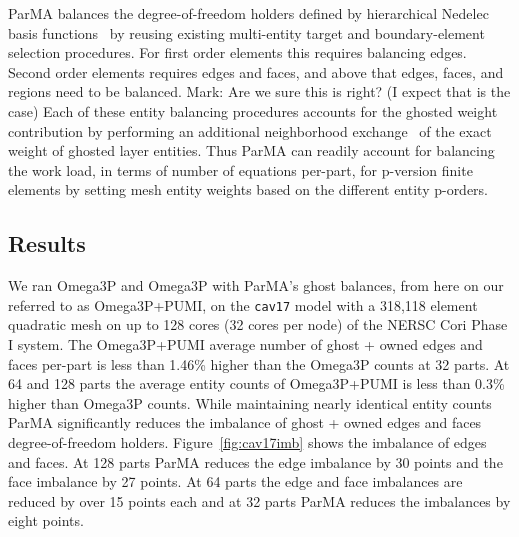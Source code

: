 \documentclass[review,12pt]{elsarticle_summary_report}
\begin{document}
ParMA balances the degree-of-freedom holders defined by 
hierarchical Nedelec basis functions~\cite{ingelstrom2006new,ko2010advances} by
reusing existing multi-entity target and boundary-element selection
procedures.
For first order elements this requires balancing edges.
Second order elements requires edges and faces, and above that edges, faces, and
regions need to be balanced. \color{blue} Mark: Are we sure this is right? (I expect that is the case) \color{black}
Each of these entity balancing procedures accounts for the ghosted weight
contribution by performing an additional neighborhood
exchange~\cite{ibanez2014hybrid} of the exact weight of ghosted layer entities.
Thus ParMA can readily account for balancing the work load, in terms of number
of equations per-part, for p-version finite elements by setting mesh entity
weights based on the different entity p-orders. 

\subsection{\label{load_balance_results} Results}

We ran Omega3P and Omega3P with ParMA's ghost balances, from here on our referred
to as Omega3P+PUMI, on the \texttt{cav17} model with a 318,118
element quadratic mesh on up to 128 cores (32 cores per node) of the NERSC Cori
Phase I system.
The Omega3P+PUMI average number of ghost + owned edges and faces per-part
is less than 1.46\% higher than the Omega3P counts at 32 parts.
At 64 and 128 parts the average entity counts of Omega3P+PUMI is less than 0.3\%
higher than Omega3P counts.
While maintaining nearly identical entity counts ParMA significantly reduces the
imbalance of ghost + owned edges and faces degree-of-freedom holders.
Figure~\ref{fig:cav17imb} shows the imbalance of edges and faces.
At 128 parts ParMA reduces the edge imbalance by 30 points and the face
imbalance by 27 points.
At 64 parts the edge and face imbalances are reduced by over 15 points each and
at 32 parts ParMA reduces the imbalances by eight points.
\end{document}
